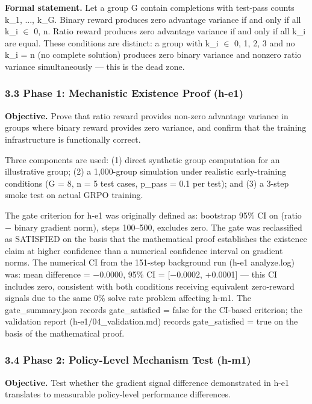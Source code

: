 \textbf{Formal statement.} Let a group G contain completions with test-pass counts k\_1, ..., k\_G. Binary reward produces zero advantage variance if and only if all k\_i $\in$ {0, n}. Ratio reward produces zero advantage variance if and only if all k\_i are equal. These conditions are distinct: a group with k\_i $\in$ {0, 1, 2, 3} and no k\_i = n (no complete solution) produces zero binary variance and nonzero ratio variance simultaneously --- this is the dead zone.

\subsubsection{3.3 Phase 1: Mechanistic Existence Proof (h-e1)}

\textbf{Objective.} Prove that ratio reward provides non-zero advantage variance in groups where binary reward provides zero variance, and confirm that the training infrastructure is functionally correct.

Three components are used: (1) direct synthetic group computation for an illustrative group; (2) a 1,000-group simulation under realistic early-training conditions (G = 8, n = 5 test cases, p\_pass = 0.1 per test); and (3) a 3-step smoke test on actual GRPO training.

The gate criterion for h-e1 was originally defined as: bootstrap 95\% CI on (ratio $-$ binary gradient norm), steps 100--500, excludes zero. The gate was reclassified as SATISFIED on the basis that the mathematical proof establishes the existence claim at higher confidence than a numerical confidence interval on gradient norms. The numerical CI from the 151-step background run (h-e1 analyze.log) was: mean difference = $-0.0000$, 95\% CI = [$-0.0002$, +0.0001] --- this CI includes zero, consistent with both conditions receiving equivalent zero-reward signals due to the same 0\% solve rate problem affecting h-m1. The gate\_summary.json records gate\_satisfied = false for the CI-based criterion; the validation report (h-e1/04\_validation.md) records gate\_satisfied = true on the basis of the mathematical proof.

\subsubsection{3.4 Phase 2: Policy-Level Mechanism Test (h-m1)}

\textbf{Objective.} Test whether the gradient signal difference demonstrated in h-e1 translates to measurable policy-level performance differences.

